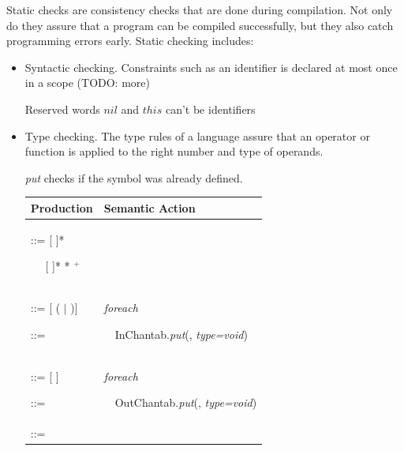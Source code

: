 Static checks are consistency checks that are done during compilation. Not only do they assure that a program can be compiled successfully, but they also catch programming errors early. Static checking includes:
\begin{itemize}
\item Syntactic checking. Constraints such as an identifier is declared at most once in a scope (TODO: more)

Reserved words $nil$ and $this$ can't be identifiers

\item Type checking. The type rules of a language assure that an operator or function is applied to the right number and type of operands.

\emph{put} checks if the symbol was already defined.


\begin{table}
\def\arraystretch{2} 
\begin{tabular*}{1\textwidth}{p{}|p{}}
\hline
Production & Semantic Action\\

\hline

\parbox{0.5\textwidth}{
 ::=   \tangled{(}  [\tangled{,} ]*

~~\tangled{|}  [\tangled{,} ]* \tangled{)} \tangled{\{} * $^+$ \tangled{\}}
} &\\
\hline
\parbox{0.5\textwidth}{
 ::=  [\tangled{:} ( $\mid$ )]

 ::= 
} & \parbox{0.5\textwidth}{
\emph{foreach} 

~~InChantab.\emph{put}(, \emph{type=void})
}\\

\hline

\parbox{0.5\textwidth}{
 ::=  [\tangled{:} ]

 ::= 
} & \parbox{0.5\textwidth}{
\emph{foreach} 

~~OutChantab.\emph{put}(, \emph{type=void})
}\\

\hline

\parbox{0.5\textwidth}{
 ::=   \tangled{;}

}
\end{tabular*}
\end{table}
\end{itemize}
